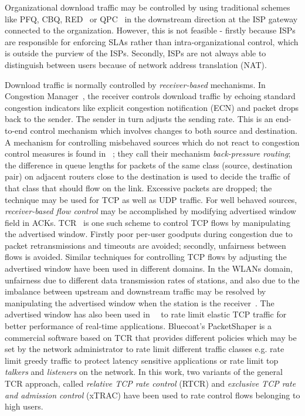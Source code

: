 \documentclass[conference]{../../IEEEtran}
\begin{document}
Organizational download traffic may be controlled by using traditional schemes like PFQ, CBQ, RED~\cite{references:wei} or QPC~\cite{references:lin} in the downstream direction at the ISP gateway connected to the organization. However, this is not feasible - firstly because ISPs are responsible for enforcing SLAs rather than intra-organizational control, which is outside the purview of the ISPs. Secondly, ISPs are not always able to distinguish between users because of network address translation (NAT).

Download traffic is normally controlled by \emph{receiver-based} mechanisms. In Congestion Manager~\cite{references:balakrishnan99}, the receiver controls download traffic by echoing standard congestion indicators like explicit congestion notification (ECN) and packet drops back to the sender. The sender in turn adjusts the sending rate. This is an end-to-end control mechanism which involves changes to both source and destination. A mechanism for controlling misbehaved sources which do not react to congestion control measures is found in ~\cite{references:li13}; they call their mechanism \emph{back-pressure routing}; the difference in queue lengths for packets of the same class (source, destination pair) on adjacent routers close to the destination is used to decide the traffic of that class that should flow on the link. Excessive packets are dropped; the technique may be used for TCP as well as UDP traffic. For well behaved sources, \emph{receiver-based flow control} may be accomplished by modifying advertised window field in ACKs. TCR~\cite{references:karandikar} is one such scheme to control TCP flows by manipulating the advertised window. Firstly poor per-user goodputs during congestion due to packet retransmissions and timeouts are avoided; secondly, unfairness between flows is avoided. Similar techniques for controlling TCP flows by adjusting the advertised window have been used in different domains. In the WLANs domain, unfairness due to different data transmission rates of stations, and also due to the imbalance between upstream and downstream traffic may be resolved by manipulating the advertised window when the station is the receiver~\cite{references:kashibuchi}. The advertised window has also been used in~\cite{references:koga}~\cite{references:palazzi10} to rate limit elastic TCP traffic for better performance of real-time applications. Bluecoat's PacketShaper\cite{references:packetshaper16} is a commercial software based on TCR that provides different policies which may be set by the network administrator to rate limit different traffic classes e.g. rate limit greedy traffic to protect latency sensitive applications or rate limit top \emph{talkers} and \emph{listeners} on the network. In this work, two variants of the general TCR approach, called  \emph{relative TCP rate control} (RTCR) and \emph{exclusive TCP rate and admission control} (xTRAC) have been used to rate control flows belonging to high users.
\end{document}
